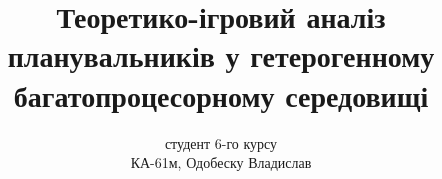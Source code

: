 \author{студент 6-го курсу\\ КА-61м, Одобеску Владислав}
\title[Теоретико-ігровий аналіз планувальників]{Теоретико-ігровий аналіз планувальників у гетерогенному багатопроцесорному середовищі}
\date{}

